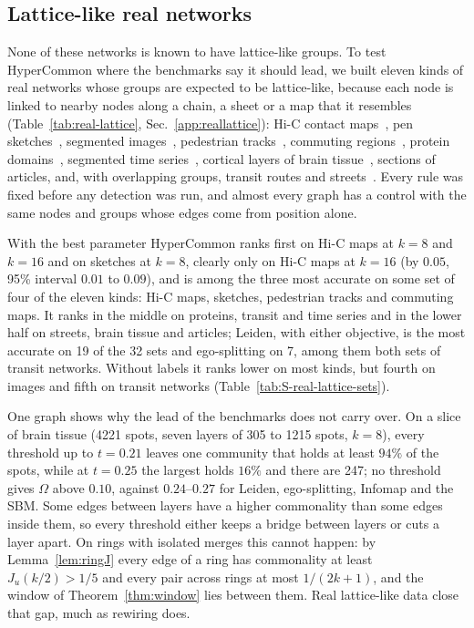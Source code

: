 \subsection{Lattice-like real networks}
\label{sec:reallattice}



None of these networks is known to have lattice-like groups. To test HyperCommon where
the benchmarks say it should lead, we built eleven kinds of real networks whose groups
are expected to be lattice-like, because each node is linked to nearby nodes along a
chain, a sheet or a map that it resembles (Table~\ref{tab:real-lattice},
Sec.~\ref{app:reallattice}): Hi-C contact maps~\cite{rao2014hic}, pen sketches~\cite{ha2018sketch}, segmented images~\cite{martin2001database,arbelaez2011contour}, pedestrian tracks~\cite{milan2016mot16}, commuting regions~\cite{census_commuting,ons_odwp01ew}, protein domains~\cite{sillitoe2021cath}, segmented time series~\cite{ermshaus2023clasp}, cortical layers of brain tissue~\cite{maynard2021transcriptome}, sections of articles, and, with overlapping groups, transit routes and streets~\cite{haklay2008openstreetmap}. Every rule was fixed before any
detection was run, and almost every graph has a control with the same nodes and groups
whose edges come from position alone.

With the best parameter HyperCommon ranks first on Hi-C maps at $k=8$ and $k=16$ and on sketches at $k=8$, clearly only on Hi-C maps at $k=16$ (by $0.05$, 95\% interval $0.01$ to $0.09$), and is among the three most accurate on some set of four of the eleven kinds: Hi-C maps, sketches, pedestrian tracks and commuting maps. It ranks in the middle on proteins, transit and time series and in the
lower half on streets, brain tissue and articles; Leiden, with either objective, is the
most accurate on 19 of the 32 sets and ego-splitting on 7, among them both sets of
transit networks. Without labels it ranks
lower on most kinds, but fourth on images and fifth on transit networks
(Table~\ref{tab:S-real-lattice-sets}).

One graph shows why the lead of the benchmarks does not carry over. On a slice of brain
tissue (4221 spots, seven layers of 305 to 1215 spots, $k=8$), every threshold up to
$t=0.21$ leaves one community that holds at least $94\%$ of the spots, while at $t=0.25$
the largest holds $16\%$ and there are 247; no threshold gives $\Omega$ above $0.10$,
against $0.24$--$0.27$ for Leiden, ego-splitting, Infomap and the SBM. Some edges between layers have
a higher commonality than some edges inside them, so every threshold either keeps a
bridge between layers or cuts a layer apart. On rings with isolated merges this cannot
happen: by Lemma~\ref{lem:ringJ} every edge of a ring has commonality at least
$J_u(k/2)>1/5$ and every pair across rings at most $1/(2k+1)$, and the window of
Theorem~\ref{thm:window} lies between them. Real
lattice-like data close that gap, much as rewiring does.
